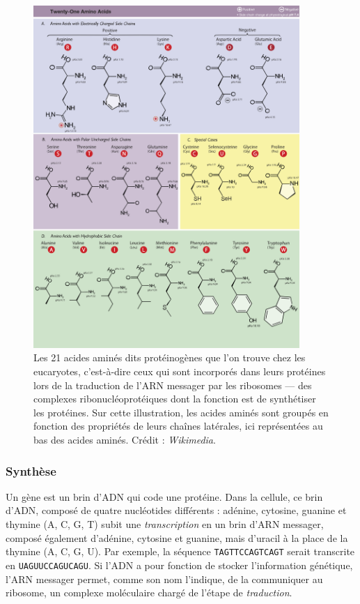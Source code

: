 	\begin{figure}[htb]
		\centering
		\includegraphics[width=0.9\textwidth]{figures/ch1/aminoAcids}
		\caption[Ensemble des acides aminés]{Les 21 acides aminés dits protéinogènes que l'on trouve chez les eucaryotes, c'est-à-dire ceux qui sont incorporés dans leurs protéines lors de la traduction de l'ARN messager par les ribosomes --- des complexes ribonucléoprotéiques dont la fonction est de synthétiser les protéines. Sur cette illustration, les acides aminés sont groupés en fonction des propriétés de leurs chaînes latérales, ici représentées \og au bas \fg{} des acides aminés. Crédit : \emph{Wikimedia}.}
		\label{fig:aminoAcids}
	\end{figure}
	
	\subsubsection{Synthèse}
	Un gène est un brin d'ADN qui \og code \fg{}  une protéine. Dans la cellule, ce brin d'ADN, composé de quatre nucléotides différents : adénine, cytosine, guanine et thymine (A, C, G, T) subit une \emph{transcription} en un brin d'ARN messager, composé également d'adénine, cytosine et guanine, mais d'uracil à la place de la thymine (A, C, G, U). Par exemple, la séquence \texttt{TAGTTCCAGTCAGT} serait transcrite en \texttt{UAGUUCCAGUCAGU}. Si l'ADN a pour fonction de stocker l'information génétique, l'ARN messager permet, comme son nom l'indique, de la communiquer au ribosome, un complexe moléculaire chargé de l'étape de \emph{traduction}.
	
